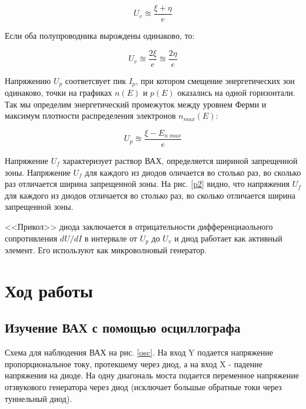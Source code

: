 \documentclass[a4paper]{article}
\begin{document}
\begin{equation}
    U_v \approxeq \frac{\xi + \eta}{e}
\end{equation}

Если оба полупроводника вырождены одинаково, то:

\begin{equation}
    U_v \approxeq \frac{2 \xi}{e} \approxeq \frac{2 \eta}{e}
\end{equation}

Напряжению $U_p$ соответсвует пик $I_p$, при котором смещение энергетических зон одинаково, точки на графиках $n(E)$ и $p(E)$ оказались на одной горизонтали. 
Так мы определим энергетический промежуток между уровнем Ферми и максимум плотности распределения электронов $n_{max}(E)$:

\begin{equation}
    U_p \approxeq \frac{\xi - E_{n \; max}}{e}
\end{equation}

Напряжение $U_f$ характеризует раствор ВАХ, определяется шириной запрещенной зоны. Напряжение $U_f$ для каждого из диодов оличается во столько раз, во сколько раз отличается ширина запрещенной зоны. 
На рис. \ref{p2} видно, что напряжения $U_f$ для каждого из диодов отличается во столько раз, во сколько отличается ширина запрещенной зоны. \par 

<<Прикол>> диода заключается в отрицательности дифференциаольного сопротивления $dU/dI$ в интервале от $U_p$ до $U_v$ и диод работает как активный элемент. Его используют как микроволновый генератор.


\section{Ход работы}

\subsection{Изучение ВАХ с помощью осциллографа}

Схема для наблюдения ВАХ на рис. \ref{osc}. На вход Y подается напряжение пропорциональное току, протекшему через диод, а на вход 
X - падение напряжения на диоде. На одну диагональ моста подается переменное напряжение отзвукового генератора через диод (исключает большые обратные токи через туннельный диод).
\end{document}
